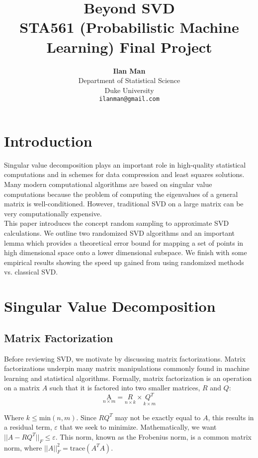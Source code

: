 \documentclass{article}
\title{Beyond SVD\\ \large{STA561 (Probabilistic Machine Learning) Final Project}}
\author{\textbf{Ilan Man}\\
Department of Statistical Science\\
Duke University\\
\texttt{ilanman@gmail.com}}
\begin{document}
\maketitle

\section{Introduction}

Singular value decomposition plays an important role in high-quality statistical computations and in schemes for data compression and least squares solutions. Many modern computational algorithms are based on singular value computations because the problem of computing the eigenvalues of a general matrix is well-conditioned. However, traditional SVD on a large matrix can be very computationally expensive.
\\

This paper introduces the concept random sampling to approximate SVD calculations. We outline two randomized SVD algorithms and an important lemma which provides a theoretical error bound for mapping a set of points in high dimensional space onto a lower dimensional subspace. We finish with some empirical results showing the speed up gained from using randomized methods vs. classical SVD.

\section{Singular Value Decomposition}

\subsection{Matrix Factorization}

Before reviewing SVD, we motivate by discussing matrix factorizations. Matrix factorizations underpin many matrix manipulations commonly found in machine learning and statistical algorithms. Formally, matrix factorization is an operation on a matrix $A$ such that it is factored into two smaller matrices, $R$ and $Q$:
\begin{equation}
\underset{n\times m}{\mathrm{A}} =  \underset{n\times k}{R} \times \underset{k\times m}{Q^{T}}
\end{equation}

Where $k \leq \text{min}(n,m)$. Since $RQ^{T}$ may not be exactly equal to $A$, this results in a residual term, $\varepsilon$ that we seek to minimize. Mathematically, we want $||A - RQ^{T}||_{F} \leq \varepsilon$. This norm, known as the Frobenius norm, is a common matrix norm, where $||A||^{2}_{F} = \text{trace}(A^{T}A)$.
\\
\end{document}
